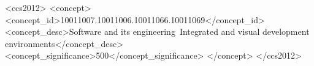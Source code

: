 \documentclass{sig-alternate-05-2015}
\def\inputtex#1{}
\begin{document}
\begin{CCSXML}
  <ccs2012>
  <concept>
  <concept_id>10011007.10011006.10011066.10011069</concept_id>
  <concept_desc>Software and its engineering~Integrated and visual development environments</concept_desc>
  <concept_significance>500</concept_significance>
  </concept>
  </ccs2012>
\end{CCSXML}


\printccsdesc


\inputtex{sec-introduction.tex}
\inputtex{sec-previous.tex}
\inputtex{sec-our-method.tex}
\inputtex{sec-performance.tex}
\inputtex{sec-conclusions.tex}
\inputtex{sec-acknowledgements.tex}



\appendix
\inputtex{app-details.tex}
\inputtex{app-invalidation.tex}
\end{document}
